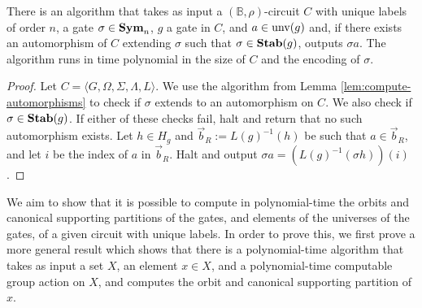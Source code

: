 \documentclass[../paper.tex]{subfiles}
\begin{document}
\begin{lem}
  There is an algorithm that takes as input a $(\mathbb{B}, \rho)$-circuit $C$ with
  unique labels of order $n$, a gate $\sigma \in \text{\textbf{Sym}}_n$, $g$ a gate in $C$, and
  $a \in \text{unv}(g)$ and, if there exists an automorphism of $C$ extending
  $\sigma$ such that $\sigma \in \text{\textbf{Stab}}(g)$, outputs $\sigma a$.
  The algorithm runs in time polynomial in the size of $C$ and the encoding of
  $\sigma$.
  \label{lem:compute-automorphisms-labels}
\end{lem}
\begin{proof}
  Let $C = \langle G, \Omega, \Sigma, \Lambda, L \rangle$. We use the algorithm
  from Lemma \ref{lem:compute-automorphisms} to check if $\sigma$ extends to an
  automorphism on $C$. We also check if $\sigma \in \text{\textbf{Stab}}(g)$. If either of
  these checks fail, halt and return that no such automorphism exists. Let $h
  \in H_g$ and $\vec{b}_R := L(g)^{-1}(h)$ be such that $a \in \vec{b}_R$, and
  let $i$ be the index of $a$ in $\vec{b}_R$. Halt and output $\sigma a =
  (L(g)^{-1}(\sigma h))(i)$.
\end{proof}

We aim to show that it is possible to compute in polynomial-time the orbits and
canonical supporting partitions of the gates, and elements of the universes of
the gates, of a given circuit with unique labels. In order to prove this, we
first prove a more general result which shows that there is a polynomial-time
algorithm that takes as input a set $X$, an element $x \in X$, and a
polynomial-time computable group action on $X$, and computes the orbit and
canonical supporting partition of $x$.
\end{document}
